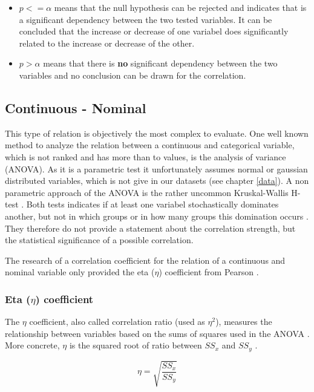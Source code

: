 \documentclass[a4paper,12pt]{report}
\begin{document}
\begin{itemize}
	\item $p <= \alpha$ means that the null hypothesis can be rejected and indicates that is a significant dependency between the two tested variables. It can be concluded that the increase or decrease of one variabel does significantly related to the increase or decrease of the other.
	\item $p > \alpha$ means that there is \textbf{no} significant dependency between the two variables and no conclusion can be drawn for the correlation.
\end{itemize}

\subsection{Continuous - Nominal}
This type of relation is objectively the most complex to evaluate. One well known method to analyze the relation between a continuous and categorical variable, which is not ranked and has more than to values, is the analysis of variance (ANOVA). As it is a parametric test it unfortunately assumes normal or gaussian distributed variables, which is not give in our datasets (see chapter \ref{data}). A non parametric approach of the ANOVA is the rather uncommon Kruskal-Wallis H-test \cite{Leon1998}. Both tests indicates if at least one variabel stochastically dominates another, but not in which groups or in how many groups this domination occurs \cite{OTSD2020}. They therefore do not provide a statement about the correlation strength, but the statistical significance of a possible correlation.

The research of a correlation coefficient for the relation of a continuous and nominal variable only provided the eta ($\eta$) coefficient from Pearson \cite{Benninghaus2007}. 

\subsubsection{Eta ($\eta$) coefficient}
The $\eta$ coefficient, also called correlation ratio (used as $\eta^2$), measures the relationship between variables based on the sums of squares used in the ANOVA \cite{Lewis2012,Benninghaus2007}. More concrete, $\eta$ is the squared root of ratio between $SS_x$ and $SS_y$ \cite{Shaldehi2013}.

\smallskip
\begin{equation}
\label{formula_eta}	
	\eta = \sqrt{\frac{SS_x}{SS_y}}
\end{equation}
\end{document}

